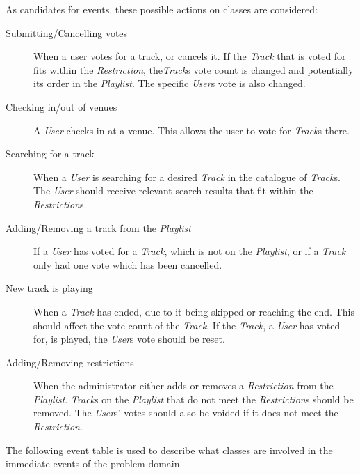 As candidates for events, these possible actions on classes are considered:
\begin{description}
\item[Submitting/Cancelling votes]
    When a user votes for a track, or cancels it. If the \textit{Track} that is voted for fits within the \textit{Restriction}, the\textit{Track}s vote count is changed and potentially its order in the \textit{Playlist}. The specific \textit{User}s vote is also changed.
\item[Checking in/out of venues]
    A \textit{User} checks in at a venue. This allows the user to vote for \textit{Track}s there.
\item[Searching for a track]
    When a \textit{User} is searching for a desired \textit{Track} in the catalogue of \textit{Track}s. The \textit{User} should receive relevant search results that fit within the \textit{Restriction}s.
\item[Adding/Removing a track from the \textit{Playlist}]
    If a \textit{User} has voted for a \textit{Track}, which is not on the \textit{Playlist}, or if a \textit{Track} only had one vote which has been cancelled.
\item[New track is playing]
    When a \textit{Track} has ended, due to it being skipped or reaching the end. This should affect the vote count of the \textit{Track}. If the \textit{Track}, a \textit{User} has voted for, is played, the \textit{User}s vote should be reset.
\item[Adding/Removing restrictions]
    When the administrator either adds or removes a \textit{Restriction} from the \textit{Playlist}. \textit{Track}s on the \textit{Playlist} that do not meet the \textit{Restriction}s should be removed. The \textit{User}s' votes should also be voided if it does not meet the \textit{Restriction}.
\end{description}

The following event table is used to describe what classes are involved in the immediate events of the problem domain.

